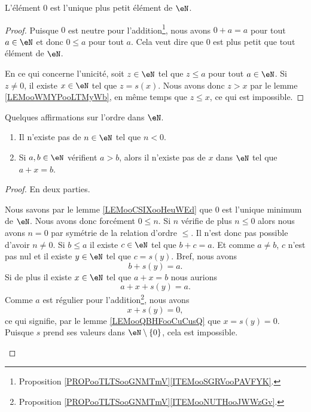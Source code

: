 \begin{lemma}       \label{LEMooCSIXooHeuWEd}
	L'élément \( 0\) est l'unique plus petit élément de \( \eN\).
\end{lemma}

\begin{proof}
	Puisque \( 0\) est neutre pour l'addition\footnote{Proposition \ref{PROPooTLTSooGNMTmV}\ref{ITEMooSGRVooPAVFYK}.}, nous avons \( 0+a=a\) pour tout \( a\in \eN\) et donc \( 0\leq a\) pour tout \( a\). Cela veut dire que \( 0\) est plus petit que tout élément de \( \eN\).

	En ce qui concerne l'unicité, soit \( z\in \eN\) tel que \( z\leq a\) pour tout \( a\in \eN\). Si \( z\neq 0\), il existe \( x\in \eN\) tel que \( z=s(x)\). Nous avons donc \( z > x\) par le lemme \ref{LEMooWMYPooLTMyWb}, en même temps que \( z \leq x\), ce qui est impossible.
\end{proof}

\begin{lemma}       \label{LEMooYMRJooYIAhBb}
	Quelques affirmations sur l'ordre dans \( \eN\).
	\begin{enumerate}
		\item       \label{ITEMooTLOIooTWNtod}
		      Il n'existe pas de \( n\in \eN\) tel que \( n<0\).
		\item       \label{ITEMooPJKQooGfLCUM}
		      Si \( a,b\in \eN\) vérifient \( a>b\), alors il n'existe pas de \( x\) dans \( \eN\) tel que \( a+x=b\).
	\end{enumerate}
\end{lemma}

\begin{proof}
	En deux parties.
	\begin{subproof}
		Nous savons par le lemme \ref{LEMooCSIXooHeuWEd} que \( 0\) est l'unique minimum de \( \eN\). Nous avons donc forcément \( 0\leq n\). Si \( n\) vérifie de plus \( n\leq 0\) alors nous avons \( n=0\) par symétrie de la relation d'ordre \( \leq\). Il n'est donc pas possible d'avoir \( n\neq 0\).
		Si \( b\leq a\) il existe \( c\in \eN\) tel que \( b+c=a\). Et comme \( a\neq b\), \( c\) n'est pas nul et il existe \( y\in \eN\) tel que \( c=s(y)\). Bref, nous avons
		\begin{equation}
			b+s(y)=a.
		\end{equation}
		Si de plus il existe \( x\in \eN\) tel que \( a+x=b\) nous aurions
		\begin{equation}
			a+x+s(y)=a.
		\end{equation}
		Comme \( a\) est régulier pour l'addition\footnote{Proposition \ref{PROPooTLTSooGNMTmV}\ref{ITEMooNUTHooJWWzGv}.}, nous avons
		\begin{equation}
			x+s(y)=0,
		\end{equation}
		ce qui signifie, par le lemme \ref{LEMooQBHFooCuCusQ} que \( x=s(y)=0\). Puisque \( s\) prend ses valeurs dans \( \eN\setminus\{ 0 \}\), cela est impossible.
	\end{subproof}
\end{proof}

